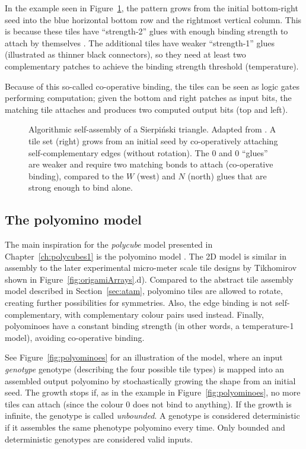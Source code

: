 In the example seen in Figure~\ref{fig:atam}, the pattern grows from the initial bottom-right seed into the blue horizontal bottom row and the rightmost vertical column. This is because these tiles have ``strength-2'' glues with enough binding strength to attach by themselves \cite{doty2012theory}. The additional tiles have weaker ``strength-1'' glues (illustrated as thinner black connectors), so they need at least two complementary patches to achieve the binding strength threshold (temperature).

Because of this so-called co-operative binding, the tiles can be seen as logic gates performing computation; given the bottom and right patches as input bits, the matching tile attaches and produces two computed output bits (top and left).



\begin{figure}[h]
  \centering
  \caption{Algorithmic self-assembly of a Sierpiński triangle. Adapted from \cite{doty2017}. A tile set (right) grows from an initial seed by co-operatively attaching self-complementary edges (without rotation). The \(0\) and \(0\) ``glues'' are weaker and require two matching bonds to attach (co-operative binding), compared to the \(W\) (west) and \(N\) (north) glues that are strong enough to bind alone.}
  \label{fig:atam}
\end{figure}

\subsection{The polyomino model}\label{sec:polyomino}

The main inspiration for the \emph{polycube} model presented in Chapter~\ref{ch:polycubes1} is the polyomino model \cite{ahnert2010self, johnston2011evolutionary}. The 2D model is similar in assembly to the later experimental micro-meter scale tile designs by Tikhomirov \cite{tikhomirov2017programmable} shown in Figure~\ref{fig:origamiArrays}.d). Compared to the abstract tile assembly model described in Section~\ref{sec:atam}, polyomino tiles are allowed to rotate, creating further possibilities for symmetries. Also, the edge binding is not self-complementary, with complementary colour pairs used instead. Finally, polyominoes have a constant binding strength (in other words, a temperature-1 model), avoiding co-operative binding.

See Figure~\ref{fig:polyominoes} for an illustration of the model, where an input \emph{genotype} genotype (describing the four possible tile types) is mapped into an assembled output polyomino by stochastically growing the shape from an initial seed. The growth stops if, as in the example in Figure~\ref{fig:polyominoes}, no more tiles can attach (since the colour \(0\) does not bind to anything). If the growth is infinite, the genotype is called \emph{unbounded}. A genotype is considered deterministic if it assembles the same phenotype polyomino every time. Only bounded and deterministic genotypes are considered valid inputs.

